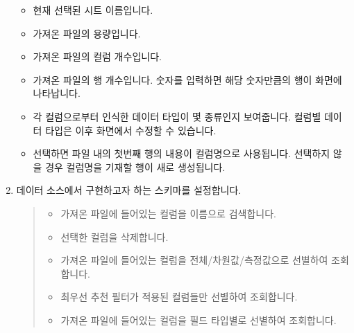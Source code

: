 \documentclass[letterpaper,10pt,english]{sphinxmanual}
\begin{document}
\begin{enumerate}
\begin{itemize}
\item {} 
 현재 선택된 시트 이름입니다.

\item {} 
 가져온 파일의 용량입니다.

\item {} 
 가져온 파일의 컬럼 개수입니다.

\item {} 
 가져온 파일의 행 개수입니다. 숫자를 입력하면 해당 숫자만큼의 행이 화면에 나타납니다.

\item {} 
 각 컬럼으로부터 인식한 데이터 타입이 몇 종류인지 보여줍니다. 컬럼별 데이터 타입은 이후 화면에서 수정할 수 있습니다.

\item {} 
 선택하면 파일 내의 첫번째 행의 내용이 컬럼명으로 사용됩니다. 선택하지 않을 경우 컬럼명을 기재할 행이 새로 생성됩니다.

\end{itemize}

\item {} 
데이터 소스에서 구현하고자 하는 스키마를 설정합니다.
\begin{quote}

\begin{figure}[H]
\centering

\noindent{}
\end{figure}
\begin{itemize}
\item {} 
 가져온 파일에 들어있는 컬럼을 이름으로 검색합니다.

\item {} 
  선택한 컬럼을 삭제합니다.

\item {} 
 가져온 파일에 들어있는 컬럼을 전체/차원값/측정값으로 선별하여 조회합니다.

\item {} 
 최우선 추천 필터가 적용된 컬럼들만 선별하여 조회합니다.

\item {} 
 가져온 파일에 들어있는 컬럼을 필드 타입별로 선별하여 조회합니다.


\end{itemize}
\end{quote}
\end{enumerate}
\end{document}
